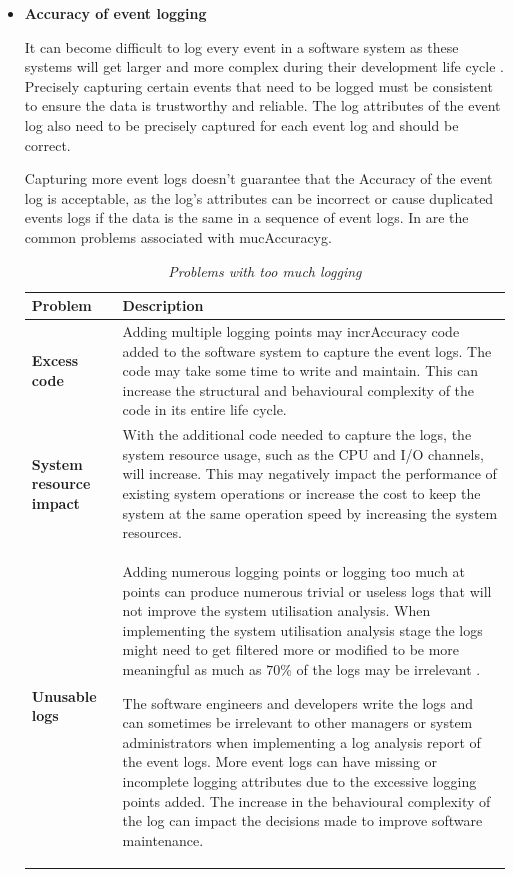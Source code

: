 \clearpage

\begin{itemize}
	\item \textbf{Accuracy of event logging}\par It can become difficult to log every event in a software system as these systems will get larger and more complex during their development life cycle \cite{Stojanov2017}. Precisely capturing certain events that need to be logged must be consistent to ensure the data is trustworthy and reliable. The log attributes of the event log also need to be precisely captured for each event log and should be correct.\par Capturing more event logs doesn't guarantee that the Accuracy of the event log is acceptable, as the log's attributes can be incorrect or cause duplicated events logs if the data is the same in a sequence of event logs. In  are the common problems associated with mucAccuracyg.

	\begin{table}[!htb]
		\centering
		\caption[Problems with too much logging]
		{\textit{Problems with too much logging \cite{Zhu2015}}}
		\label{tbl:ch1_loggingTooMuch}
		\begin{tabularx}{\linewidth}{|l|X|}
			\hline \textbf{Problem}  & \textbf{Description} \\
			\hline \textbf{Excess code} & Adding multiple logging points may incrAccuracy code added to the software system to capture the event logs. The code may take some time to write and maintain. This can increase the structural and behavioural complexity of the code in its entire life cycle. \\
			\hline \textbf{System resource impact} & With the additional code needed to capture the logs, the system resource usage, such as the CPU and I/O channels, will increase. This may negatively impact the performance of existing system operations or increase the cost to keep the system at the same operation speed by increasing the system resources.\\
			\hline \textbf{Unusable logs} & Adding numerous logging points or logging too much at points can produce numerous trivial or useless logs that will not improve the system utilisation analysis. When implementing the system utilisation analysis stage the logs might need to get filtered more or modified to be more meaningful as much as $70\%$ of the logs may be irrelevant \cite{Fedaghi2010}. \par The software engineers and developers write the logs and can sometimes be irrelevant to other managers or system administrators when implementing a log analysis report of the event logs. More event logs can have missing or incomplete logging attributes due to the excessive logging points added. The increase in the behavioural complexity of the log can impact the decisions made to improve software maintenance. \\
			\hline
		\end{tabularx}
	\end{table}


\end{itemize}
